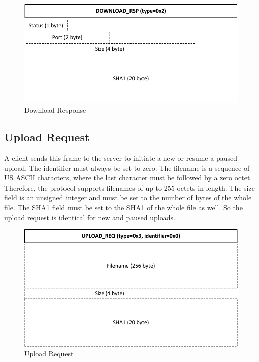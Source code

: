 \documentclass[]{article}
\begin{document}
\begin{figure}[H]
\centering
\includegraphics[width=\textwidth]{frames/download-rsp.pdf}
\caption{Download Response}
\label{DOWNLOAD-RSP}
\end{figure}

\subsection{Upload Request}

A client sends this frame to the server to initiate a new 
or resume a paused upload. The identifier must always be set to zero.  
The filename is a sequence of US ASCII
characters, where the last character must be followed by a zero octet.
Therefore, the protocol supports filenames of up to 255 octets in length.
The size field is an unsigned integer and must be set to the number
of bytes of the whole file. The SHA1 field must be set to the SHA1
of the whole file as well. So the upload request is identical for
new and paused uploads.

\begin{figure}[H]
\centering
\includegraphics[width=\textwidth]{frames/upload-req.pdf}
\caption{Upload Request}
\label{UPLOAD-REQ}
\end{figure}
\end{document}
